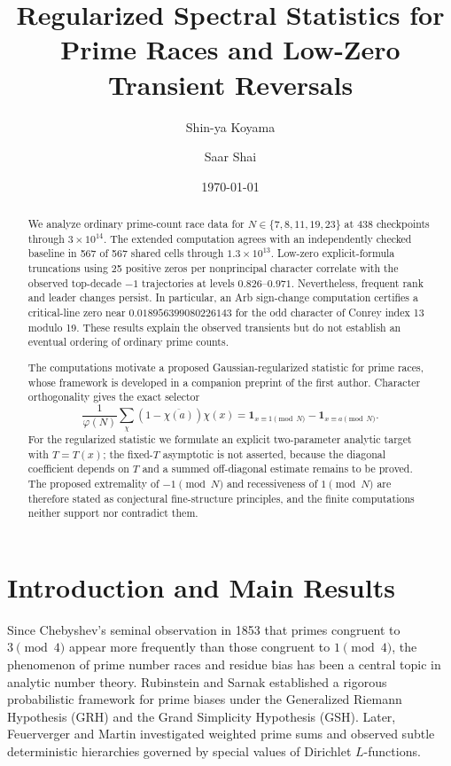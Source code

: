\documentclass[12pt,reqno]{amsart}
\title[Regularized Prime-Race Statistics]{Regularized Spectral Statistics for Prime Races and Low-Zero Transient Reversals}
\author{Shin-ya Koyama}
\author{Saar Shai}
\date{\today}
\theoremstyle{definition}
\theoremstyle{remark}
\numberwithin{equation}{section}
\begin{document}
\begin{abstract}
We analyze ordinary prime-count race data for
$N\in\{7,8,11,19,23\}$ at 438 checkpoints through $3\times10^{14}$.
The extended computation agrees with an independently checked baseline in
567 of 567 shared cells through $1.3\times10^{13}$.  Low-zero explicit-formula
truncations using 25 positive zeros per nonprincipal character correlate with
the observed top-decade $-1$ trajectories at levels $0.826$--$0.971$.
Nevertheless, frequent rank and leader changes persist.  In particular, an
Arb sign-change computation certifies a critical-line zero near
$0.018956399080226143$ for the odd character of Conrey index 13 modulo 19.
These results explain the observed transients but do not establish an eventual
ordering of ordinary prime counts.

The computations motivate a proposed Gaussian-regularized statistic for prime
races, whose framework is developed in a companion preprint of the first
author.  Character orthogonality gives the exact selector
\[
 \frac1{\varphi(N)}\sum_\chi(1-\overline{\chi(a)})\chi(x)
 =\mathbf 1_{x\equiv1\pmod N}-\mathbf 1_{x\equiv a\pmod N}.
\]
For the regularized statistic we formulate an explicit two-parameter analytic
target with $T=T(x)$; the fixed-$T$ asymptotic is not asserted, because the
diagonal coefficient depends on $T$ and a summed off-diagonal estimate remains
to be proved.  The proposed extremality of $-1\pmod N$ and recessiveness of
$1\pmod N$ are therefore stated as conjectural fine-structure principles, and
the finite computations neither support nor contradict them.
\end{abstract}

\maketitle

\section{Introduction and Main Results}

Since Chebyshev's seminal observation in 1853 that primes congruent to $3 \pmod 4$ appear more frequently than those congruent to $1 \pmod 4$, the phenomenon of prime number races and residue bias has been a central topic in analytic number theory. Rubinstein and Sarnak \cite{RS94} established a rigorous probabilistic framework for prime biases under the Generalized Riemann Hypothesis (GRH) and the Grand Simplicity Hypothesis (GSH). Later, Feuerverger and Martin \cite{FM00} investigated weighted prime sums and observed subtle deterministic hierarchies governed by special values of Dirichlet $L$-functions.
\end{document}
